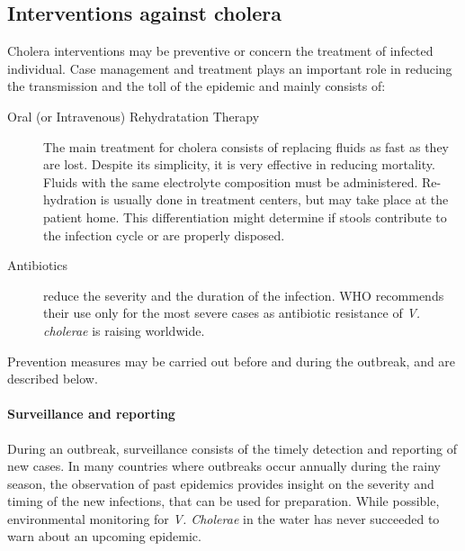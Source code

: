 \subsection{Interventions against cholera} 
Cholera interventions may be preventive or concern the treatment of infected individual. Case management and treatment plays an important role in reducing the transmission and the toll of the epidemic and mainly consists of:
\begin{description}
\item[Oral (or Intravenous) Rehydratation Therapy] The main treatment for cholera consists of replacing fluids as fast as they are lost. Despite its simplicity, it is very effective in reducing mortality. Fluids with the same electrolyte composition must be administered\cite{Kuhn:GlucoseNotRiceBased:2014}.  Re-hydration is usually done in treatment centers, but may take place at the patient home. This differentiation might determine if stools contribute to the infection cycle or are properly disposed.
\item[Antibiotics] reduce the severity and the duration of the infection. WHO recommends their use only for the most severe cases as antibiotic resistance of \emph{V. cholerae} is raising worldwide\cite{Sack:GettingSeriousCholera:2006}.
\end{description}

Prevention measures may be carried out before and during the outbreak, and are described below.

\paragraph{Surveillance and reporting} During an outbreak, surveillance consists of the timely detection and reporting of new cases. In many countries where outbreaks occur annually during the rainy season, the observation of past epidemics provides insight on the severity and timing of the new infections, that can be used for preparation\cite{Baracchini:SeasonalityCholeraDynamics:2017}. While possible, environmental monitoring for \textit{V. Cholerae} in the water has never succeeded to warn about an upcoming epidemic. 

